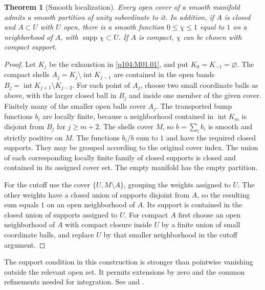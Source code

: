 \documentclass[11pt,oneside,openany]{book}
\newtheorem{theorem}{Theorem}[chapter]
\theoremstyle{definition}
\theoremstyle{remark}
\DeclareMathOperator{\supp}{supp}
\begin{document}
\begin{theorem}[Smooth localization]\label{p104:M01.06}
Every open cover of a smooth manifold admits a smooth partition of
unity subordinate to it. In addition, if \(A\) is closed and
\(A\subset U\) with \(U\) open, there is a smooth function
\(0\leq\chi\leq1\) equal to \(1\) on a neighborhood of \(A\), with
\(\supp\chi\subset U\). If \(A\) is compact, \(\chi\) can be chosen
with compact support.
\end{theorem}

\begin{proof}
Let \(K_j\) be the exhaustion in \cref{p104:M01.01}, and put
\(K_0=K_{-1}=\varnothing\). The compact shells
\(A_j=K_j\setminus\operatorname{int}K_{j-1}\) are contained in
the open bands
\(B_j=\operatorname{int}K_{j+1}\setminus K_{j-2}\).
For each point of \(A_j\), choose two small coordinate balls as
above, with the larger closed ball in \(B_j\) and inside one
member of the given cover. Finitely many of the smaller open
balls cover \(A_j\). The transported bump functions \(b_i\)
are locally finite, because a neighborhood contained in
\(\operatorname{int}K_m\) is disjoint from \(B_j\) for
\(j\geq m+2\). The shells cover \(M\), so
\(b=\sum_i b_i\) is smooth and strictly positive on \(M\).
The functions \(b_i/b\) sum to \(1\) and have the required
closed supports. They may be grouped according to the original
cover index. The union of each corresponding locally finite
family of closed supports is closed and contained in its
assigned cover set. The empty manifold has the empty partition.

For the cutoff use the cover \(\{U,M\setminus A\}\), grouping the
weights assigned to \(U\). The other weights have a closed union
of supports disjoint from \(A\), so the resulting sum equals \(1\)
on an open neighborhood of \(A\). Its support is contained in
the closed union of supports assigned to \(U\). For compact \(A\)
first choose an open neighborhood of \(A\) with compact closure
inside \(U\) by a finite union of small coordinate balls, and
replace \(U\) by that smaller neighborhood in the cutoff argument.
\end{proof}

The support condition in this construction is stronger than pointwise
vanishing outside the relevant open set. It permits extensions by zero
and the common refinements needed for integration. See
\cite[Theorem~2.23 and Proposition~2.25]{lee} and
\cite[Section~13 and Appendix~C]{tu}.
\end{document}
